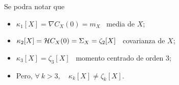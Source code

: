 {Se podra notar que
%
\begin{itemize}
\item $\kappa_1[X] = \nabla C_X(0) = m_X$ \ media de $X$;
%
\item $\kappa_2[X] = \mathcal{H} C_X(0) = \Sigma_X = \zeta_2[X]$ \ covarianza de $X$;
%
\item $\kappa_3[X] = \zeta_3[X]$ \ momento centrado de orden 3;
%
\item Pero, $\forall \: k > 3, \quad \kappa_k[X] \ne \zeta_k[X]$.
\end{itemize}

%
}

